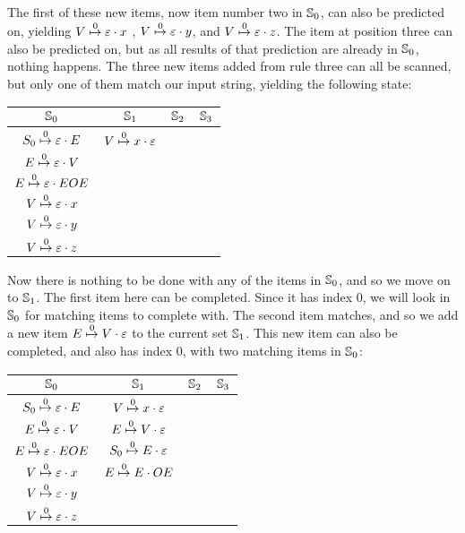 		The first of these new items, now item number two in $\St{0}$, can also
		be predicted on, yielding $\earley{V}{\varepsilon}{x}{0}$ ,
		$\earley{V}{\varepsilon}{y}{0}$, and $\earley{V}{\varepsilon}{z}{0}$.
		The item at position three can also be predicted on, but as all results
		of that prediction are already in $\St{0}$, nothing happens. The three
		new items added from rule three can all be scanned, but only one of
		them match our input string, yielding the following state:

		\begin{table}[h]
		\centering
		\begin{tabular}{|c|c|c|c|}
			\hline
			$\St{0}$                          & $\St{1}$ & $\St{2}$ & $\St{3}$ \\ 
			\hline
			$\earley{S_0}{\varepsilon}{E}{0}$ & $\earley{V}{x}{\varepsilon}{0}$ & &\\
			$\earley{E}{\varepsilon}{V}{0}$   & & & \\
			$\earley{E}{\varepsilon}{EOE}{0}$ & & & \\
			$\earley{V}{\varepsilon}{x}{0}$   & & & \\
			$\earley{V}{\varepsilon}{y}{0}$   & & & \\
			$\earley{V}{\varepsilon}{z}{0}$   & & & \\
			\hline
		\end{tabular}
		\end{table}

		Now there is nothing to be done with any of the items in $\St{0}$, and 
		so we move on to $\St{1}$. The first item here can be completed. Since
		it has index $0$, we will look in $\St{0}$ for matching items to 
		complete with. The second item matches, and so we add a new item
		$\earley{E}{V}{\varepsilon}{0}$ to the current set $\St{1}$. This new 
		item can also be completed, and also has index $0$, with two matching 
		items in $\St{0}$:

		\begin{table}[h]
		\centering
		\begin{tabular}{|c|c|c|c|}
			\hline
			$\St{0}$                          & $\St{1}$ & $\St{2}$ & $\St{3}$ \\ 
			\hline
			$\earley{S_0}{\varepsilon}{E}{0}$ & $\earley{V}{x}{\varepsilon}{0}$   &  & \\
			$\earley{E}{\varepsilon}{V}{0}$   & $\earley{E}{V}{\varepsilon}{0}$   &  & \\
			$\earley{E}{\varepsilon}{EOE}{0}$ & $\earley{S_0}{E}{\varepsilon}{0}$ &  & \\
			$\earley{V}{\varepsilon}{x}{0}$   & $\earley{E}{E}{OE}{0}$            &  & \\
			$\earley{V}{\varepsilon}{y}{0}$   &                                   &  & \\
			$\earley{V}{\varepsilon}{z}{0}$   &                                   &  & \\
			\hline
		\end{tabular}
		\end{table}

